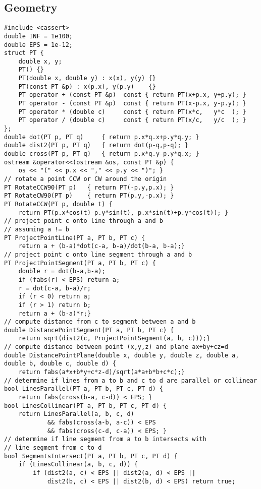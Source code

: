 \documentclass[8pt, oneside]{extarticle}
\begin{document}
\begin{multicols}{3}
\subsection{Geometry}
\begin{lstlisting}
#include <cassert>
double INF = 1e100;
double EPS = 1e-12;
struct PT { 
    double x, y; 
    PT() {}
    PT(double x, double y) : x(x), y(y) {}
    PT(const PT &p) : x(p.x), y(p.y)    {}
    PT operator + (const PT &p)  const { return PT(x+p.x, y+p.y); }
    PT operator - (const PT &p)  const { return PT(x-p.x, y-p.y); }
    PT operator * (double c)     const { return PT(x*c,   y*c  ); }
    PT operator / (double c)     const { return PT(x/c,   y/c  ); }
};
double dot(PT p, PT q)     { return p.x*q.x+p.y*q.y; }
double dist2(PT p, PT q)   { return dot(p-q,p-q); }
double cross(PT p, PT q)   { return p.x*q.y-p.y*q.x; }
ostream &operator<<(ostream &os, const PT &p) {
    os << "(" << p.x << "," << p.y << ")"; }
// rotate a point CCW or CW around the origin
PT RotateCCW90(PT p)   { return PT(-p.y,p.x); }
PT RotateCW90(PT p)    { return PT(p.y,-p.x); }
PT RotateCCW(PT p, double t) { 
    return PT(p.x*cos(t)-p.y*sin(t), p.x*sin(t)+p.y*cos(t)); }
// project point c onto line through a and b
// assuming a != b
PT ProjectPointLine(PT a, PT b, PT c) {
    return a + (b-a)*dot(c-a, b-a)/dot(b-a, b-a);}
// project point c onto line segment through a and b
PT ProjectPointSegment(PT a, PT b, PT c) {
    double r = dot(b-a,b-a);
    if (fabs(r) < EPS) return a;
    r = dot(c-a, b-a)/r;
    if (r < 0) return a;
    if (r > 1) return b;
    return a + (b-a)*r;}
// compute distance from c to segment between a and b
double DistancePointSegment(PT a, PT b, PT c) {
    return sqrt(dist2(c, ProjectPointSegment(a, b, c)));}
// compute distance between point (x,y,z) and plane ax+by+cz=d
double DistancePointPlane(double x, double y, double z, double a, double b, double c, double d) {
    return fabs(a*x+b*y+c*z-d)/sqrt(a*a+b*b+c*c);}
// determine if lines from a to b and c to d are parallel or collinear
bool LinesParallel(PT a, PT b, PT c, PT d) { 
    return fabs(cross(b-a, c-d)) < EPS; }
bool LinesCollinear(PT a, PT b, PT c, PT d) { 
    return LinesParallel(a, b, c, d)
            && fabs(cross(a-b, a-c)) < EPS
            && fabs(cross(c-d, c-a)) < EPS; }
// determine if line segment from a to b intersects with 
// line segment from c to d
bool SegmentsIntersect(PT a, PT b, PT c, PT d) {
    if (LinesCollinear(a, b, c, d)) {
        if (dist2(a, c) < EPS || dist2(a, d) < EPS ||
            dist2(b, c) < EPS || dist2(b, d) < EPS) return true;

\end{lstlisting}
\end{multicols}
\end{document}
